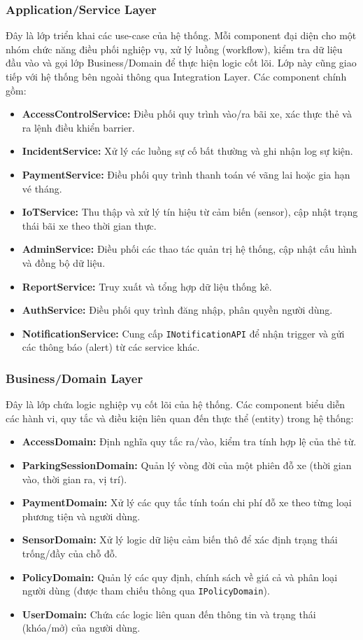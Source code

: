 \subsubsection{Application/Service Layer}
Đây là lớp triển khai các use-case của hệ thống. Mỗi component đại diện cho một nhóm chức năng điều phối nghiệp vụ, xử lý luồng (workflow), kiểm tra dữ liệu đầu vào và gọi lớp Business/Domain để thực hiện logic cốt lõi. Lớp này cũng giao tiếp với hệ thống bên ngoài thông qua Integration Layer. Các component chính gồm:
\begin{itemize}
    \item \textbf{AccessControlService:} Điều phối quy trình vào/ra bãi xe, xác thực thẻ và ra lệnh điều khiển barrier.
    \item \textbf{IncidentService:} Xử lý các luồng sự cố bất thường và ghi nhận log sự kiện.
    \item \textbf{PaymentService:} Điều phối quy trình thanh toán vé vãng lai hoặc gia hạn vé tháng.
    \item \textbf{IoTService:} Thu thập và xử lý tín hiệu từ cảm biến (sensor), cập nhật trạng thái bãi xe theo thời gian thực.
    \item \textbf{AdminService:} Điều phối các thao tác quản trị hệ thống, cập nhật cấu hình và đồng bộ dữ liệu.
    \item \textbf{ReportService:} Truy xuất và tổng hợp dữ liệu thống kê.
    \item \textbf{AuthService:} Điều phối quy trình đăng nhập, phân quyền người dùng.
    \item \textbf{NotificationService:} Cung cấp \texttt{INotificationAPI} để nhận trigger và gửi các thông báo (alert) từ các service khác.
\end{itemize}

\subsubsection{Business/Domain Layer}
Đây là lớp chứa logic nghiệp vụ cốt lõi của hệ thống. Các component biểu diễn các hành vi, quy tắc và điều kiện liên quan đến thực thể (entity) trong hệ thống:
\begin{itemize}
    \item \textbf{AccessDomain:} Định nghĩa quy tắc ra/vào, kiểm tra tính hợp lệ của thẻ từ.
    \item \textbf{ParkingSessionDomain:} Quản lý vòng đời của một phiên đỗ xe (thời gian vào, thời gian ra, vị trí).
    \item \textbf{PaymentDomain:} Xử lý các quy tắc tính toán chi phí đỗ xe theo từng loại phương tiện và người dùng.
    \item \textbf{SensorDomain:} Xử lý logic dữ liệu cảm biến thô để xác định trạng thái trống/đầy của chỗ đỗ.
    \item \textbf{PolicyDomain:} Quản lý các quy định, chính sách về giá cả và phân loại người dùng (được tham chiếu thông qua \texttt{IPolicyDomain}).
    \item \textbf{UserDomain:} Chứa các logic liên quan đến thông tin và trạng thái (khóa/mở) của người dùng.
\end{itemize}

